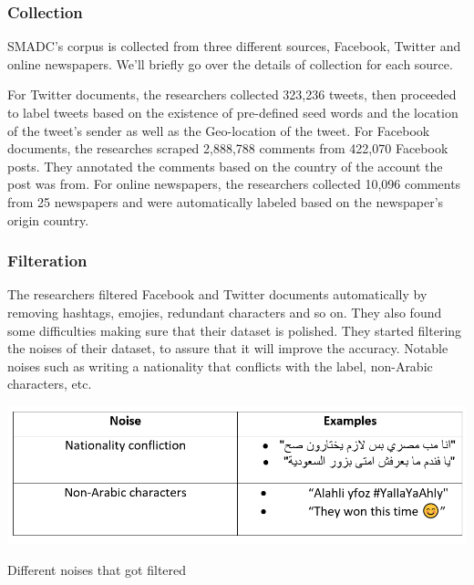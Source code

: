 \documentclass[12pt]{diazessay}
\begin{document}
                \subsubsection{Collection}
                SMADC's corpus is collected from three different sources, Facebook, Twitter and online newspapers. We'll briefly go over the details of collection for each source. 
                
                For Twitter documents, the researchers collected 323,236 tweets, then proceeded to label tweets based on the existence of pre-defined seed words and the location of the tweet's sender as well as the Geo-location of the tweet. For Facebook documents, the researches scraped 2,888,788 comments from 422,070 Facebook posts. They annotated the comments based on the country of the account the post was from. For online newspapers, the researchers collected 10,096 comments from 25 newspapers and were automatically labeled based on the newspaper's origin country\cite{alshutayri}.
                
                \subsubsection{Filteration}
                The researchers filtered Facebook and Twitter documents automatically by removing hashtags, emojies, redundant characters and so on. They also found some difficulties making sure that their dataset is polished. They started filtering the noises of their dataset, to assure that it will improve the accuracy. Notable noises such as writing a nationality that conflicts with the label, non-Arabic characters, etc.\cite{alshutayri}
        
                \begin{table}[h]
                    \centering
                    \includegraphics[scale=0.80]{Figures/noises_table_edited.PNG}
                    \caption{Different noises that got filtered}
                    \label{tbl:noises}
                \end{table}
                
\end{document}
